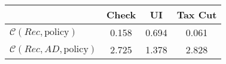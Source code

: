 \begin{tabular}{@{}lccc@{}} 
\toprule 
                          & Check      & UI    & Tax Cut    \\  \midrule 
$\mathcal{C}(Rec,\text{policy})$ & 0.158  & 0.694  & 0.061     \\ 
$\mathcal{C}(Rec, AD,\text{policy})$ & 2.725  & 1.378  & 2.828     \\ 
\end{tabular}  
